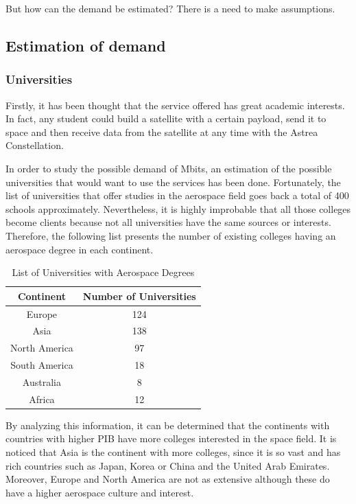 But how can the demand be estimated? There is a need to make assumptions. 

\subsection{Estimation of demand}

\subsubsection{Universities}
Firstly, it has been thought that the service offered has great academic interests. In fact, any student could build a satellite with a certain payload, send it to space and then receive data from the satellite at any time with the Astrea Constellation. 

In order to study the possible demand of Mbits, an estimation of the possible universities that would want to use the services has been done. Fortunately, the list of universities that offer studies in the aerospace field goes back a total of 400 schools approximately. Nevertheless, it is highly improbable that all those colleges become clients because not all universities have the same sources or interests. Therefore, the following list presents the number of existing colleges having an aerospace degree in each continent.

	\begin{table}[H]
	\begin{center}
	\begin{tabular}{|c|c|}
	\bf{Continent} & \bf{Number of Universities}\\
	\hline 
	Europe & 124\\
	\hline 
	Asia & 138\\
	\hline 
	North America &  97\\
	\hline
	 South America & 18\\
	\hline 
	Australia & 8\\
	\hline 
	Africa & 12\\
	\end{tabular}
	\end{center}
	\caption{List of Universities with Aerospace Degrees}
	\end{table} 	

By analyzing this information, it can be determined that the continents with countries with higher PIB have more colleges interested in the space field. It is noticed that Asia is the continent with more colleges, since it is so vast and has rich countries such as Japan, Korea or China and the United Arab Emirates. Moreover, Europe and North America are not as extensive although these do have a higher aerospace culture and interest. 

